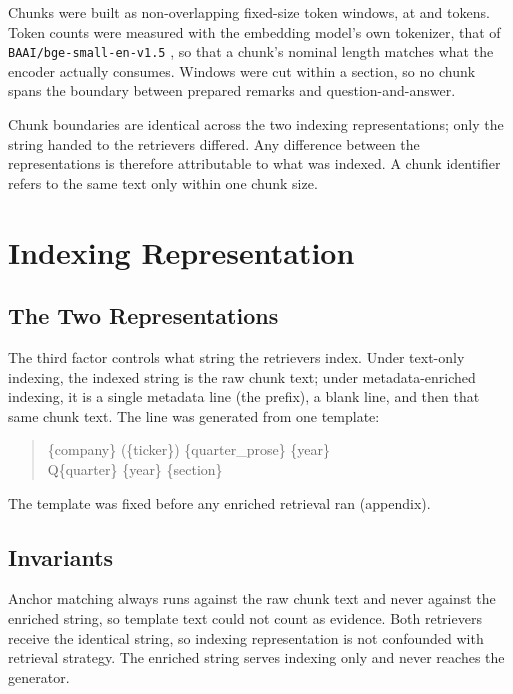 Chunks were built as non-overlapping fixed-size token windows, at
\thesisChunkSizeSmall{} and \thesisChunkSizeLarge{} tokens. Token counts were
measured with the embedding model's own tokenizer, that of
\texttt{BAAI/bge-small-en-v1.5} \parencite{baai2023}, so that a chunk's nominal
length matches what the encoder actually consumes. Windows were cut within a
section, so no chunk spans the boundary between prepared remarks and
question-and-answer.

Chunk boundaries are identical across the two indexing representations; only the
string handed to the retrievers differed. Any difference between the
representations is therefore attributable to what was indexed. A chunk identifier refers to the same text only within
one chunk size.

\section{Indexing Representation}

\subsection{The Two Representations}

The third factor controls what string the retrievers index. Under text-only
indexing, the indexed string is the raw chunk text; under metadata-enriched
indexing, it is a single metadata line (the prefix), a blank line, and then that
same chunk text. The line was generated from one template:

\begin{quote}
\ttfamily
\{company\} (\{ticker\}) \{quarter\_prose\} \{year\} \\
Q\{quarter\} \{year\} \{section\}
\end{quote}

\noindent
The template was fixed before any enriched retrieval ran (appendix).

\subsection{Invariants}

Anchor matching always runs against the raw chunk text and never against the
enriched string, so template text could not count as evidence. Both retrievers
receive the identical string, so indexing representation is not confounded with
retrieval strategy. The enriched string serves indexing only and never reaches
the generator.

